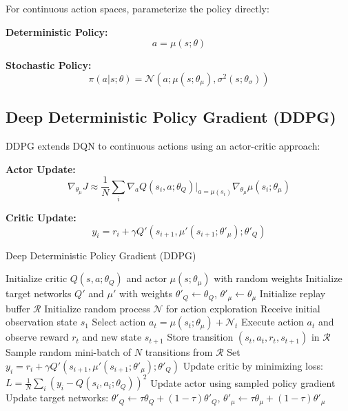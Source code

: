 For continuous action spaces, parameterize the policy directly:

\textbf{Deterministic Policy:}
\begin{equation}
a = \mu(s; \theta)
\end{equation}

\textbf{Stochastic Policy:}
\begin{equation}
\pi(a|s; \theta) = \mathcal{N}(a; \mu(s; \theta_\mu), \sigma^2(s; \theta_\sigma))
\end{equation}

\subsection{Deep Deterministic Policy Gradient (DDPG)}

DDPG extends DQN to continuous actions using an actor-critic approach:

\textbf{Actor Update:}
\begin{equation}
\nabla_{\theta_\mu} J \approx \frac{1}{N} \sum_i \nabla_a Q(s_i, a; \theta_Q) \big|_{a=\mu(s_i)} \nabla_{\theta_\mu} \mu(s_i; \theta_\mu)
\end{equation}

\textbf{Critic Update:}
\begin{equation}
y_i = r_i + \gamma Q'(s_{i+1}, \mu'(s_{i+1}; \theta'_\mu); \theta'_Q)
\end{equation}

\begin{algorithm}
\caption{Deep Deterministic Policy Gradient (DDPG)}
\begin{algorithmic}
\STATE Initialize critic $Q(s,a; \theta_Q)$ and actor $\mu(s; \theta_\mu)$ with random weights
\STATE Initialize target networks $Q'$ and $\mu'$ with weights $\theta'_Q \leftarrow \theta_Q$, $\theta'_\mu \leftarrow \theta_\mu$
\STATE Initialize replay buffer $\mathcal{R}$
    \STATE Initialize random process $\mathcal{N}$ for action exploration
    \STATE Receive initial observation state $s_1$
        \STATE Select action $a_t = \mu(s_t; \theta_\mu) + \mathcal{N}_t$
        \STATE Execute action $a_t$ and observe reward $r_t$ and new state $s_{t+1}$
        \STATE Store transition $(s_t, a_t, r_t, s_{t+1})$ in $\mathcal{R}$
        \STATE Sample random mini-batch of $N$ transitions from $\mathcal{R}$
        \STATE Set $y_i = r_i + \gamma Q'(s_{i+1}, \mu'(s_{i+1}; \theta'_\mu); \theta'_Q)$
        \STATE Update critic by minimizing loss: $L = \frac{1}{N} \sum_i (y_i - Q(s_i, a_i; \theta_Q))^2$
        \STATE Update actor using sampled policy gradient
        \STATE Update target networks: $\theta'_Q \leftarrow \tau \theta_Q + (1-\tau) \theta'_Q$, $\theta'_\mu \leftarrow \tau \theta_\mu + (1-\tau) \theta'_\mu$
    \ENDFOR
\ENDFOR
\end{algorithmic}
\end{algorithm}

